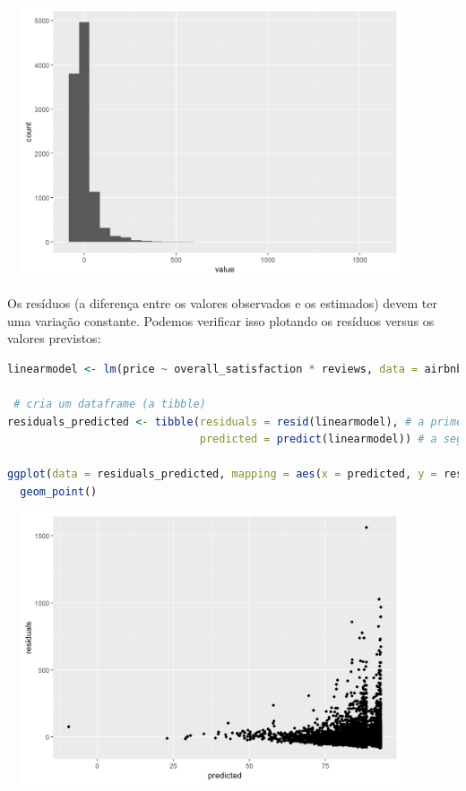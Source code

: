 \documentclass{article}
\begin{document}
\begin{center}
\includegraphics[width=12cm,height=8cm]{modelling_normality-1.png} 
\end{center}

\vspace{.25cm}


\vspace{.25cm}

Os resíduos (a diferença entre os valores observados e os estimados) devem ter uma variação constante. Podemos verificar isso plotando os resíduos versus os valores previstos:

\begin{lstlisting}[language=R]
linearmodel <- lm(price ~ overall_satisfaction * reviews, data = airbnb)

 # cria um dataframe (a tibble)
residuals_predicted <- tibble(residuals = resid(linearmodel), # a primeira variavel são residuos, que sao os residuos do nosso modelo linear
                              predicted = predict(linearmodel)) # a segunda variavel eh prevista, quais sao os valores previstos do nosso modelo linear

ggplot(data = residuals_predicted, mapping = aes(x = predicted, y = residuals)) + 
  geom_point()
\end{lstlisting}

\begin{center}
\includegraphics[width=12cm,height=8cm]{modelling_homoscedasticity-1.png} 
\end{center}
\end{document}
